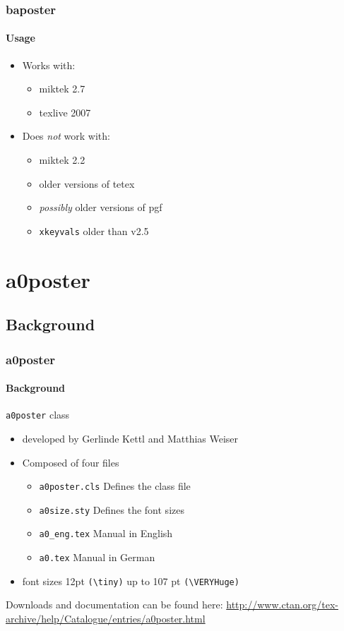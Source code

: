 \documentclass[11pt]{beamer}
\begin{document}
\begin{frame}
	\frametitle{baposter}\framesubtitle{Usage}
\begin{itemize}
	\item Works with:
		\begin{itemize}
				\item miktek 2.7
				\item texlive 2007
		\end{itemize}
	\item Does \emph{\emph{not}} work with:
			\begin{itemize}
				\item miktek 2.2
				\item older versions of tetex
				\item \emph{possibly} older versions of pgf
				\item \verb|xkeyvals| older than v2.5
		\end{itemize}
\end{itemize}
\end{frame}


\section{a0poster}
\subsection{Background}
\begin{frame}
\frametitle{a0poster}\framesubtitle{Background}
	\verb|a0poster| class
			\begin{itemize}
				\item developed by Gerlinde Kettl and Matthias Weiser
				\item Composed of four files
				\begin{itemize}
					\item \verb|a0poster.cls| Defines the class file
					\item \verb|a0size.sty|		Defines the font sizes
					\item \verb|a0_eng.tex|		Manual in English
					\item \verb|a0.tex|				Manual in German
				\end{itemize}
				\item font sizes 12pt \verb|(\tiny)| up to 107 pt \verb|(\VERYHuge)|	
			\end{itemize}
		Downloads and documentation can be found here:  \url{http://www.ctan.org/tex-archive/help/Catalogue/entries/a0poster.html}
\end{frame}
\end{document}

